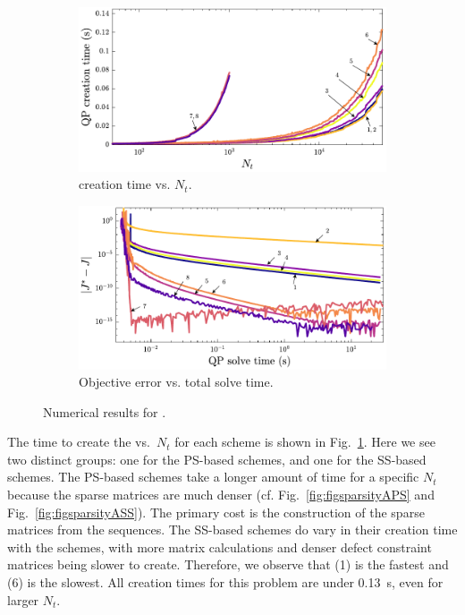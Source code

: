 \begin{figure}
\begin{subfigure}{0.5\textwidth}
\centering
\includegraphics[width=\textwidth]{../ch5/figures/ex1_sens_qp_time}%
\caption{\qp{} creation time vs. $N_t$.}
\label{fig:ch5:ex1sens:qptime}
\end{subfigure}%
\begin{subfigure}{0.5\textwidth}
\centering
\includegraphics[width=\textwidth]{../ch5/figures/ex1_sens_solve_time}%
\caption{Objective error vs. total \qp{} solve time.}
\label{fig:ch5:ex1sens:solvetime}
\end{subfigure}%

\caption{Numerical results for .}
\label{fig:ch5:ex1sens}
\end{figure}%

The time to create the \qp{} vs.~$N_t$ for each scheme is shown in Fig.~\ref{fig:ch5:ex1sens:qptime}.
Here we see two distinct groups: one for the PS-based schemes, and one for the SS-based schemes.
The PS-based schemes take a longer amount of time for a specific $N_t$ because the sparse matrices are much denser (cf. Fig.~\ref{fig:figsparsityAPS} and Fig.~\ref{fig:figsparsityASS}).
The primary cost is the construction of the sparse matrices from the sequences.
The SS-based schemes do vary in their creation time with the schemes, with more matrix calculations and denser defect constraint matrices being slower to create.
Therefore, we observe that (1) is the fastest and (6) is the slowest.
All creation times for this problem are under 0.13~s, even for larger $N_t$.

